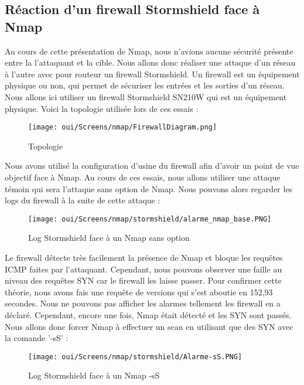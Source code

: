 \subsection{Réaction d'un firewall Stormshield face à Nmap}

Au cours de cette présentation de Nmap, nous n'avions aucune sécurité présente entre la l'attaquant et la cible. Nous allons donc réaliser une attaque d'un réseau à l'autre avec pour routeur un firewall Stormshield. Un firewall est un équipement physique ou non, qui permet de sécuriser les entrées et les sorties d'un réseau. Nous allons ici utiliser un firewall Stormshield SN210W qui est un équipement physique. Voici la topologie utilisée lors de ces essais :

\begin{figure}[htp!]
  \centering
  \setlength\figureheight{7cm}
  \setlength\figurewidth{9cm}
  \texttt{[image: oui/Screens/nmap/FirewallDiagram.png]}
  \caption{Topologie}
  \label{fig:courbe-tikz}
\end{figure}

\newpage
Nous avons utilisé la configuration d'usine du firewall afin d'avoir un point de vue objectif face à Nmap. Au cours de ces essais, nous allons utiliser une attaque témoin qui sera l'attaque sans option de Nmap. Nous pouvons alors regarder les logs du firewall à la suite de cette attaque :

\begin{figure}[htp!]
  \centering
  \setlength\figureheight{7cm}
  \setlength\figurewidth{9cm}
  \texttt{[image: oui/Screens/nmap/stormshield/alarme\_nmap\_base.PNG]}
  \caption{Log Stormshield face à un Nmap sans option}
  \label{fig:courbe-tikz}
\end{figure}

\newpage
Le firewall détecte très facilement la présence de Nmap et bloque les requêtes ICMP faites par l'attaquant. Cependant, nous pouvons observer une faille au niveau des requêtes SYN car le firewall les laisse passer. Pour confirmer cette théorie, nous avons fais une requête de versions qui s'est aboutie en 152,93 secondes. Nous ne pouvons pas afficher les alarmes tellement les firewall en a déclaré. Cependant, encore une fois, Nmap était détecté et les SYN sont passés. Nous allons donc forcer Nmap à effectuer un scan en utilisant que des SYN avec la comande '-sS' :

\begin{figure}[htp!]
  \centering
  \setlength\figureheight{7cm}
  \setlength\figurewidth{9cm}
  \texttt{[image: oui/Screens/nmap/stormshield/Alarme-sS.PNG]}
  \caption{Log Stormshield face à un Nmap -sS}
  \label{fig:courbe-tikz}
\end{figure}

